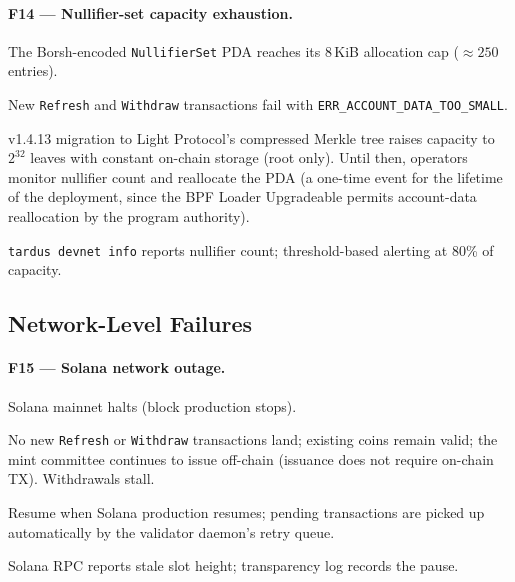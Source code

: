 \paragraph{F14 --- Nullifier-set capacity exhaustion.}
\begin{description}[leftmargin=2em,style=nextline,itemsep=0pt]
  \item[Trigger] The Borsh-encoded \texttt{NullifierSet} PDA reaches its
    8\,KiB allocation cap ($\approx 250$ entries).
  \item[Consequence] New \texttt{Refresh} and \texttt{Withdraw}
    transactions fail with \texttt{ERR\_ACCOUNT\_DATA\_TOO\_SMALL}.
  \item[Recovery] v1.4.13 migration to Light Protocol's compressed
    Merkle tree raises capacity to $2^{32}$ leaves with constant
    on-chain storage (root only). Until then, operators monitor
    nullifier count and reallocate the PDA (a one-time event for
    the lifetime of the deployment, since the BPF Loader Upgradeable
    permits account-data reallocation by the program authority).
  \item[Detection] \texttt{tardus devnet info} reports nullifier count;
    threshold-based alerting at 80\% of capacity.
\end{description}

\subsection{Network-Level Failures}
\label{sec:failure-network}

\paragraph{F15 --- Solana network outage.}
\begin{description}[leftmargin=2em,style=nextline,itemsep=0pt]
  \item[Trigger] Solana mainnet halts (block production stops).
  \item[Consequence] No new \texttt{Refresh} or \texttt{Withdraw}
    transactions land; existing coins remain valid; the mint
    committee continues to issue off-chain (issuance does not
    require on-chain TX). Withdrawals stall.
  \item[Recovery] Resume when Solana production resumes; pending
    transactions are picked up automatically by the validator
    daemon's retry queue.
  \item[Detection] Solana RPC reports stale slot height; transparency
    log records the pause.
\end{description}

